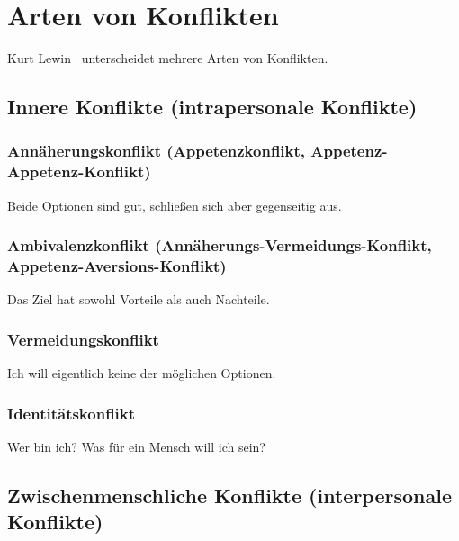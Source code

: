 \section{Arten von Konflikten}
\label{konflikt-arten}

Kurt Lewin~\cite{gelingende-kommunikation-revisited, schneider-konflikte} unterscheidet mehrere Arten von Konflikten.

\subsection{Innere Konflikte (intrapersonale Konflikte)}

\subsubsection{Annäherungskonflikt (Appetenzkonflikt, Appetenz-Appetenz-Konflikt)}

Beide Optionen sind gut, schließen sich aber gegenseitig aus.

\subsubsection{Ambivalenzkonflikt (Annäherungs-Vermeidungs-Konflikt, Appetenz-Aversions-Konflikt)}

Das Ziel hat sowohl Vorteile als auch Nachteile.

\subsubsection{Vermeidungskonflikt}

Ich will eigentlich keine der möglichen Optionen.

\subsubsection{Identitätskonflikt}

Wer bin ich? Was für ein Mensch will ich sein?

\subsection{Zwischenmenschliche Konflikte (interpersonale Konflikte)}

